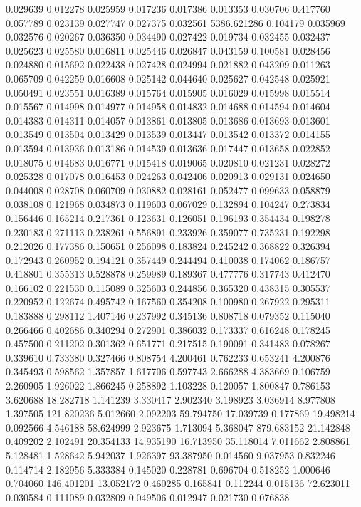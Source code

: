 0.029639
0.012278
0.025959
0.017236
0.017386
0.013353
0.030706
0.417760
0.057789
0.023139
0.027747
0.027375
0.032561
5386.621286
0.104179
0.035969
0.032576
0.020267
0.036350
0.034490
0.027422
0.019734
0.032455
0.032437
0.025623
0.025580
0.016811
0.025446
0.026847
0.043159
0.100581
0.028456
0.024880
0.015692
0.022438
0.027428
0.024994
0.021882
0.043209
0.011263
0.065709
0.042259
0.016608
0.025142
0.044640
0.025627
0.042548
0.025921
0.050491
0.023551
0.016389
0.015764
0.015905
0.016029
0.015998
0.015514
0.015567
0.014998
0.014977
0.014958
0.014832
0.014688
0.014594
0.014604
0.014383
0.014311
0.014057
0.013861
0.013805
0.013686
0.013693
0.013601
0.013549
0.013504
0.013429
0.013539
0.013447
0.013542
0.013372
0.014155
0.013594
0.013936
0.013186
0.014539
0.013636
0.017447
0.013658
0.022852
0.018075
0.014683
0.016771
0.015418
0.019065
0.020810
0.021231
0.028272
0.025328
0.017078
0.016453
0.024263
0.042406
0.020913
0.029131
0.024650
0.044008
0.028708
0.060709
0.030882
0.028161
0.052477
0.099633
0.058879
0.038108
0.121968
0.034873
0.119603
0.067029
0.132894
0.104247
0.273834
0.156446
0.165214
0.217361
0.123631
0.126051
0.196193
0.354434
0.198278
0.230183
0.271113
0.238261
0.556891
0.233926
0.359077
0.735231
0.192298
0.212026
0.177386
0.150651
0.256098
0.183824
0.245242
0.368822
0.326394
0.172943
0.260952
0.194121
0.357449
0.244494
0.410038
0.174062
0.186757
0.418801
0.355313
0.528878
0.259989
0.189367
0.477776
0.317743
0.412470
0.166102
0.221530
0.115089
0.325603
0.244856
0.365320
0.438315
0.305537
0.220952
0.122674
0.495742
0.167560
0.354208
0.100980
0.267922
0.295311
0.183888
0.298112
1.407146
0.237992
0.345136
0.808718
0.079352
0.115040
0.266466
0.402686
0.340294
0.272901
0.386032
0.173337
0.616248
0.178245
0.457500
0.211202
0.301362
0.651771
0.217515
0.190091
0.341483
0.078267
0.339610
0.733380
0.327466
0.808754
4.200461
0.762233
0.653241
4.200876
0.345493
0.598562
1.357857
1.617706
0.597743
2.666288
4.383669
0.106759
2.260905
1.926022
1.866245
0.258892
1.103228
0.120057
1.800847
0.786153
3.620688
18.282718
1.141239
3.330417
2.902340
3.198923
3.036914
8.977808
1.397505
121.820236
5.012660
2.092203
59.794750
17.039739
0.177869
19.498214
0.092566
4.546188
58.624999
2.923675
1.713094
5.368047
879.683152
21.142848
0.409202
2.102491
20.354133
14.935190
16.713950
35.118014
7.011662
2.808861
5.128481
1.528642
5.942037
1.926397
93.387950
0.014560
9.037953
0.832246
0.114714
2.182956
5.333384
0.145020
0.228781
0.696704
0.518252
1.000646
0.704060
146.401201
13.052172
0.460285
0.165841
0.112244
0.015136
72.623011
0.030584
0.111089
0.032809
0.049506
0.012947
0.021730
0.076838
